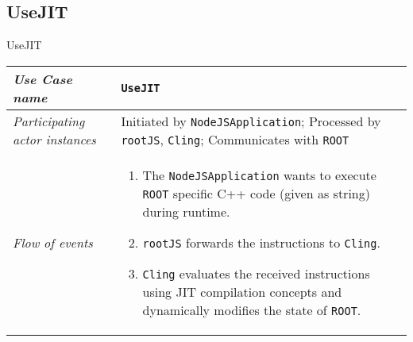 \subsection{UseJIT}
\begin{frame}{UseJIT}
        \begin{longtable}{p{3cm} @{\hskip 1cm} p{7cm}}
                \hline

                \textit{Use Case name} & \texttt{UseJIT}\\
                \hline

                \textit{Participating actor instances} & Initiated by \texttt{NodeJSApplication}; Processed by \texttt{rootJS}, \texttt{Cling}; Communicates with \texttt{ROOT}\\
                \hline
                                \pause

                \textit{Flow of events} &
                        \begin{enumerate}
                                \item The \texttt{NodeJSApplication} wants to execute \texttt{ROOT} specific C++ code (given as string) during runtime.
                                \pause
                                \item \texttt{rootJS} forwards the instructions to \texttt{Cling}.
                                \pause
                                \item \texttt{Cling} evaluates the received instructions using JIT compilation concepts and dynamically modifies the state of \texttt{ROOT}.
                        \end{enumerate}
                        \\
        \end{longtable}
\end{frame}
